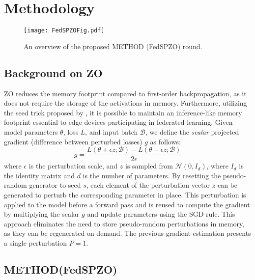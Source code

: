 
\section{Methodology}
\begin{figure*}[t!]
    \centering
    \texttt{[image: FedSPZOFig.pdf]}
    \caption{An overview of the proposed \acl{METHOD} (FedSPZO) round.}
    \label{fig:FLDesign}
\end{figure*}

\subsection{Background on \acl{ZO}}

\acl{ZO} reduces the memory footprint compared to first-order backpropagation, as it does not require the storage of the activations in memory. Furthermore, utilizing the seed trick proposed by \cite{malladi2023fine}, it is possible to maintain an inference-like memory footprint essential to edge devices participating in federated learning. Given model parameters $\theta$, loss $L$, and input batch $\mathcal{B}$,  we define the \textit{scalar} projected gradient (difference between perturbed losses)  $g$ as follows:
\begin{equation}
g = \frac{L (\theta + \epsilon z ; \mathcal{B}) - L(\theta - \epsilon z; \mathcal{B})}{2  \epsilon}  
\end{equation}
where $\epsilon$ is the perturbation scale, and $z$ is sampled from  $\mathcal{N}(0, I_{d})$, where $I_{d}$ is the identity matrix and $d$ is the number of parameters. By resetting the pseudo-random generator to seed $s$, each element of the perturbation vector $z$ can be generated to perturb the corresponding parameter in place. This perturbation is applied to the model before a forward pass and is reused to compute the gradient by multiplying the scalar $g$ and update parameters using the SGD rule. This approach eliminates the need to store pseudo-random perturbations in memory, as they can be regenerated on demand.
The previous gradient estimation presents a single perturbation $P=1$.%




\subsection{\acl{METHOD}(FedSPZO)}

